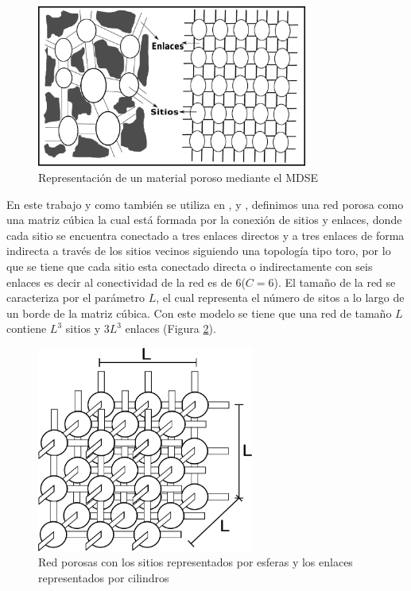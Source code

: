 \begin{figure}[hbtp]
\centering
\includegraphics[width=3.5in]{img/dsbm_es.pdf}
\caption{Representación de un material poroso mediante el MDSE}
\label{fig:dbsm}
\end{figure}

En este trabajo y como también se utiliza en \cite{ref2}, \cite{ref3} y \cite{ref4}, definimos una red porosa como una matriz cúbica la cual está formada por la conexión de sitios y enlaces, donde cada sitio se encuentra conectado a tres enlaces directos y a tres enlaces de forma indirecta a través de los sitios vecinos siguiendo una topología tipo toro, por lo que se tiene que cada sitio esta conectado directa o indirectamente con seis enlaces es decir al conectividad de la red es de 6($C=6$). El tamaño de la red se caracteriza por el parámetro $L$, el cual representa el número de sitos a lo largo de un borde de la matriz cúbica. Con este modelo se tiene que una red de tamaño $L$ contiene $L^3$ sitios y $3L^3$ enlaces (Figura \ref{fig:lattice3d}).

\begin{figure}[hbtp]
\centering
\includegraphics[width=2.8in]{img/red.pdf}
\caption{Red porosas con los sitios representados por esferas y los enlaces representados por cilindros}
\label{fig:lattice3d}
\end{figure}
 
